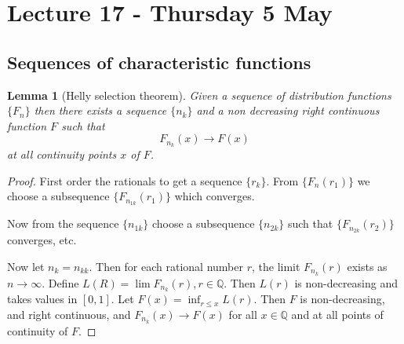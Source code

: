 \documentclass[10pt, oneside, reqno]{amsart}
\theoremstyle{plain}%
\newtheorem{lem}[thm]{Lemma}
\theoremstyle{definition}
\theoremstyle{remark}
\newcommand{\Q}{\mathbb{Q}}
\begin{document}
\section{Lecture 17 - Thursday 5 May} %
\label{sec:lecture_17_thursday_5_may}
\subsection{Sequences of characteristic functions} %
\label{sub:sequences_of_characteristic_functions}

\begin{lem}[Helly selection theorem]\label{lem:hellysel}
    Given a sequence of distribution functions $\{ F_n \}$ then there exists a sequence $\{ n_k \}$ and a non decreasing right continuous function $F$ such that \[
        F_{n_k}(x) \rightarrow F(x)
    \] at all continuity points $x$ of $F$.  
\end{lem}
\begin{proof}
    First order the rationals to get a sequence $\{ r_k \}$.  From $\{ F_n(r_1)\}$ we choose a subsequence $\{ F_{n_{1k}}(r_1) \}$ which converges.  
    
    Now from the sequence $\{ n_{1k} \}$ choose a subsequence $\{ n_{2k} \}$ such that $\{ F_{n_{2k}}(r_2) \}$ converges, etc.
    
    Now let $n_k = n_{kk}$.  Then for each rational number $r$, the limit $F_{n_k}(r)$ exists as $n \rightarrow \infty$.  Define $L(R) = \lim F_{n_k}(r), r \in \Q$.  Then $L(r)$ is non-decreasing and takes values in $[0,1]$.  Let $F(x) = \inf_{r \leq x} L(r)$.  Then $F$ is non-decreasing, and right continuous, and $F_{n_k}(x) \rightarrow F(x)$ for all $x \in \Q$ and at all points of continuity of $F$.  
\end{proof}
\end{document}
